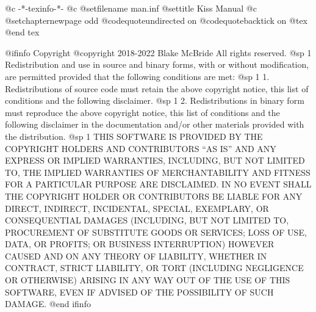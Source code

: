     @c -*-texinfo-*-
@c %
@setfilename man.inf
@settitle Kiss Manual
@c %
@setchapternewpage odd
@codequoteundirected on
@codequotebacktick on
@tex
\global\def\linkcolor{0 0 1}  %
\global\def\urlcolor{0 0 1}   %
@end tex

@ifinfo
Copyright  @copyright{} 2018-2022 Blake McBride
All rights reserved.
@sp 1
Redistribution and use in source and binary forms, with or without
modification, are permitted provided that the following conditions are
met:
@sp 1
1. Redistributions of source code must retain the above copyright
notice, this list of conditions and the following disclaimer.
@sp 1
2. Redistributions in binary form must reproduce the above copyright
notice, this list of conditions and the following disclaimer in the
documentation and/or other materials provided with the distribution.
@sp 1
THIS SOFTWARE IS PROVIDED BY THE COPYRIGHT HOLDERS AND CONTRIBUTORS
``AS IS'' AND ANY EXPRESS OR IMPLIED WARRANTIES, INCLUDING, BUT NOT
LIMITED TO, THE IMPLIED WARRANTIES OF MERCHANTABILITY AND FITNESS FOR
A PARTICULAR PURPOSE ARE DISCLAIMED. IN NO EVENT SHALL THE COPYRIGHT
HOLDER OR CONTRIBUTORS BE LIABLE FOR ANY DIRECT, INDIRECT, INCIDENTAL,
SPECIAL, EXEMPLARY, OR CONSEQUENTIAL DAMAGES (INCLUDING, BUT NOT
LIMITED TO, PROCUREMENT OF SUBSTITUTE GOODS OR SERVICES; LOSS OF USE,
DATA, OR PROFITS; OR BUSINESS INTERRUPTION) HOWEVER CAUSED AND ON ANY
THEORY OF LIABILITY, WHETHER IN CONTRACT, STRICT LIABILITY, OR TORT
(INCLUDING NEGLIGENCE OR OTHERWISE) ARISING IN ANY WAY OUT OF THE USE
OF THIS SOFTWARE, EVEN IF ADVISED OF THE POSSIBILITY OF SUCH DAMAGE.
@end ifinfo

